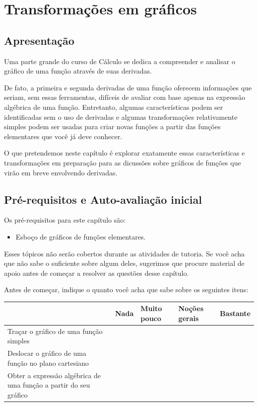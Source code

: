 \documentclass[main_estudante.tex]{subfiles}
\begin{document}
\chapter{Transformações em gráficos}

\section{Apresentação}

Uma parte grande do curso de Cálculo se dedica a compreender e analisar o gráfico de uma função através de suas derivadas.

De fato, a primeira e segunda derivadas de uma função oferecem informações que seriam, sem essas ferramentas, difíceis de avaliar com base apenas na expressão algébrica de uma função. Entretanto, algumas características podem ser identificadas sem o uso de derivadas e algumas transformações relativamente simples podem ser usadas para criar novas funções a partir das funções elementares que você já deve conhecer.

O que pretendemos neste capítulo é explorar exatamente essas características e transformações em preparação para as dicussões sobre gráficos de funções que virão em breve envolvendo derivadas.

\newpage

\section{Pré-requisitos e Auto-avaliação inicial}

Os pré-requisitos para este capítulo são:
\begin{itemize}
 \item Esboço de gráficos de funções elementares.
\end{itemize}

Esses tópicos não serão cobertos durante as atividades de tutoria. Se você acha que não sabe o suficiente sobre algum deles, sugerimos que procure material de apoio antes de começar a resolver as questões desse capítulo.

Antes de começar, indique o quanto você acha que sabe sobre os seguintes itens:

\begin{center}
 \begin{tabular}{|p{35mm}||p{15mm}|p{15mm}|p{15mm}|p{15mm}|} 
 \hline
   & Nada & Muito pouco & Noções gerais & Bastante\\
 \hline
 Traçar o gráfico de uma função simples &  &  &  &  \\ 
 \hline
 Deslocar o gráfico de uma função no plano cartesiano &  &  &  &  \\
 \hline
 Obter a expressão algébrica de uma função a partir do seu gráfico &  &  &  &  \\
 \hline
\end{tabular}
\end{center}
\end{document}
